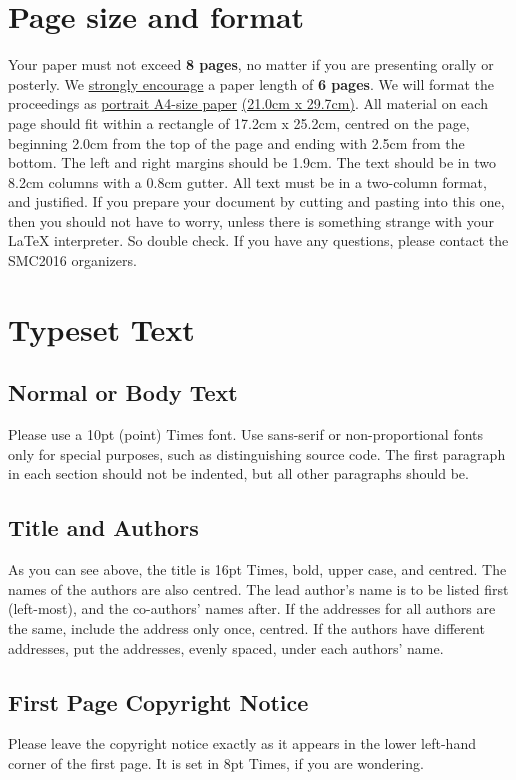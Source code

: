 \documentclass{article}
\begin{document}
\section{Page size and format}\label{sec:page_size}
Your paper must not exceed {\bf 8 pages},
no matter if you are presenting orally or posterly.
We \underline{strongly encourage}
a paper length of {\bf 6 pages}.
We will format the proceedings as
 \underline{portrait A4-size paper} \underline{(21.0cm x 29.7cm)}.
All material on each page should fit within a rectangle of 17.2cm x 25.2cm,
centred on the page, beginning 2.0cm from the top of the page and ending 
with 2.5cm from the bottom.
The left and right margins should be 1.9cm.
The text should be in two 8.2cm columns with a 0.8cm gutter.
All text must be in a two-column format, and justified.
If you prepare your document by cutting and pasting into this one,
then you should not have to worry, 
unless there is something strange with your \LaTeX{} interpreter.
So double check.
If you have any questions, please contact the SMC2016 organizers.

\section{Typeset Text}\label{sec:typeset_text}

\subsection{Normal or Body Text}\label{subsec:body}
Please use a 10pt (point) Times font. 
Use sans-serif or non-proportional fonts
only for special purposes, 
such as distinguishing source code.
The first paragraph in each section should not be indented, 
but all other paragraphs should be.

\subsection{Title and Authors}
As you can see above, the title is 16pt Times, bold, upper case, and centred.
The names of the authors are also centred.
The lead author's name is to be listed first (left-most), and the co-authors' 
names after. If the addresses for all authors are the same, include the 
address only once, centred. If the authors have different addresses, put the 
addresses, evenly spaced, under each authors' name.

\subsection{First Page Copyright Notice}
Please leave the copyright notice exactly as it appears in the lower 
left-hand corner of the first page. It is set in 8pt Times, if you are wondering.
\end{document}
